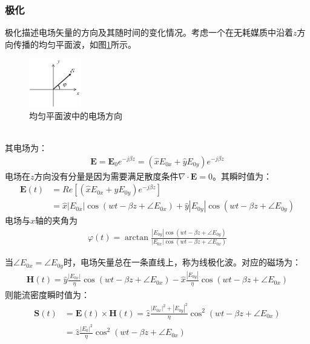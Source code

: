 \documentclass{article}
\numberwithin{equation}{section}
\renewcommand{\vec}[1]{\boldsymbol{#1}}
\begin{document}
\subsubsection{极化}
极化描述电场矢量的方向及其随时间的变化情况。考虑一个在无耗媒质中沿着$z$方向传播的均匀平面波，如图\ref{fig:fig40}所示。
\begin{figure}[ht]
    \centering
    \includegraphics[width=0.2\textwidth]{均匀平面波中的电场方向.PNG}
    \caption{均匀平面波中的电场方向}
    \label{fig:fig40}
\end{figure}
\\
其电场为：
\begin{align}
    \label{eq:eq356}
    \mathbf{E}=\mathbf{E}_0e^{-j\beta z}=(\hat{x}E_{0x}+\hat{y}E_{0y})e^{-j\beta z}
\end{align}
电场在$z$方向没有分量是因为需要满足散度条件$\nabla\cdot\mathbf{E}=0$。其瞬时值为：
\begin{align}
    \label{eq:eq357}
    \mathcal{\vec{E}}(t)&=Re[(\hat{x}E_{0x}+\hat{y}E_{0y})e^{-j\beta z}] \nonumber \\
                        &=\hat{x}|E_{0x}|\cos(wt-\beta z+\angle E_{0x})+\hat{y}|E_{0y}|\cos(wt-\beta z+\angle E_{0y})
\end{align}
电场与$x$轴的夹角为
\begin{align}
    \label{eq:eq358}
    \varphi(t)=\arctan\frac{|E_{0y}|\cos(wt-\beta z+\angle E_{0y})}{|E_{0x}|\cos(wt-\beta z+\angle E_{0x})}
\end{align}
\par
当$\angle E_{0x}=\angle E_{0y}$时，电场矢量总在一条直线上，称为线极化波。对应的磁场为：
\begin{align}
    \label{eq:eq359}
    \mathcal{\vec{H}}(t)=\hat{y}\frac{|E_{0x}|}{\eta}\cos(wt-\beta z+\angle E_{0x})-\hat{x}\frac{|E_{0y}|}{\eta}\cos(wt-\beta z+\angle E_{0x})
\end{align}
则能流密度瞬时值为：
\begin{align}
    \label{eq:eq360}
    \mathcal{\vec{S}}(t)&=\mathcal{\vec{E}}(t)\times\mathcal{\vec{H}}(t)=\hat{z}\frac{|E_{0x}|^2+|E_{0y}|^2}{\eta}\cos^2(wt-\beta z+\angle E_{0x}) \nonumber \\
                        &=\hat{z}\frac{|E_0|^2}{\eta}\cos^2(wt-\beta z+\angle E_{0x})
\end{align}
\end{document}
